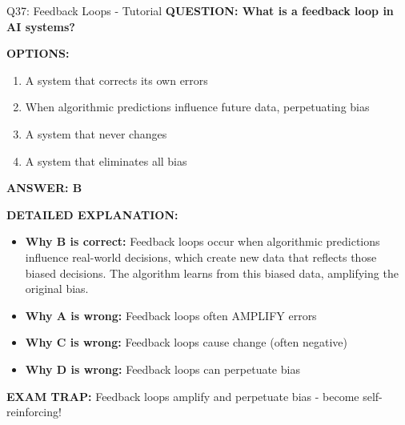 \documentclass[8pt]{beamer}
\begin{document}
	\begin{frame}{Q37: Feedback Loops - Tutorial}
		\fontsize{6.5}{7.5}\selectfont
		\textbf{QUESTION: What is a feedback loop in AI systems?}
		
		\vspace{0.1cm}
		\textbf{OPTIONS:}
		\begin{enumerate}
			\item A system that corrects its own errors
			\item When algorithmic predictions influence future data, perpetuating bias
			\item A system that never changes
			\item A system that eliminates all bias
		\end{enumerate}
		
		\vspace{0.1cm}
		\textcolor{myblue}{\textbf{ANSWER: B}}
		
		\vspace{0.1cm}
		\textbf{DETAILED EXPLANATION:}
		\begin{itemize}
			\item \textbf{Why B is correct:} Feedback loops occur when algorithmic predictions influence real-world decisions, which create new data that reflects those biased decisions. The algorithm learns from this biased data, amplifying the original bias.
			\item \textbf{Why A is wrong:} Feedback loops often AMPLIFY errors
			\item \textbf{Why C is wrong:} Feedback loops cause change (often negative)
			\item \textbf{Why D is wrong:} Feedback loops can perpetuate bias
		\end{itemize}
		
		\textcolor{myred}{\textbf{EXAM TRAP:}} Feedback loops \textcolor{myblue}{amplify and perpetuate bias} - become self-reinforcing!
	\end{frame}
	
\end{document}
